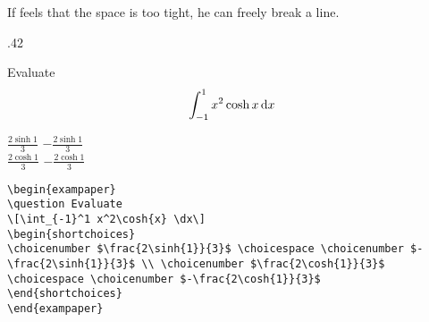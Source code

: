 If \raul{} feels that the space is too tight, he can freely break a line.
\begin{miniexammar}{.42\textandmarginlen}{
\begin{exampaper}
\question Evaluate
\[
\int_{-1}^1 x^2\cosh{x} \,\mathrm{d} x
\]
\begin{shortchoices}
\choicenumber $\frac{2\sinh{1}}{3}$\choicespace
\choicenumber $-\frac{2\sinh{1}}{3}$ \\
\choicenumber $\frac{2\cosh{1}}{3}$\choicespace
\choicenumber $-\frac{2\cosh{1}}{3}$
\end{shortchoices}
\end{exampaper}
}
\begin{lstlisting}
\begin{exampaper}
\question Evaluate
\[\int_{-1}^1 x^2\cosh{x} \dx\]
\begin{shortchoices}
\choicenumber $\frac{2\sinh{1}}{3}$ \choicespace \choicenumber $-\frac{2\sinh{1}}{3}$ \\ \choicenumber $\frac{2\cosh{1}}{3}$ \choicespace \choicenumber $-\frac{2\cosh{1}}{3}$ 
\end{shortchoices}
\end{exampaper}
\end{lstlisting}
\end{miniexammar}

